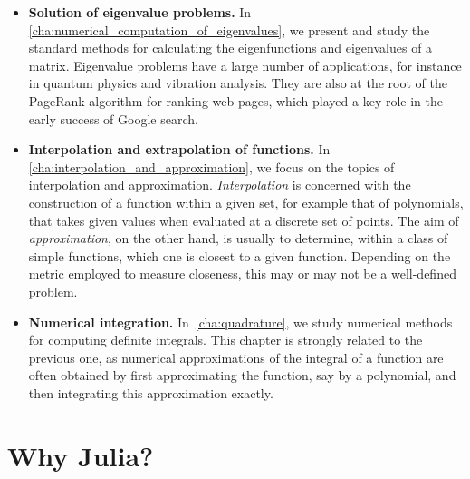 \begin{itemize}
    \item
        \textbf{Solution of eigenvalue problems.}
        In \cref{cha:numerical_computation_of_eigenvalues},
        we present and study the standard methods for calculating the eigenfunctions and eigenvalues of a matrix.
        Eigenvalue problems have a large number of applications,
        for instance in quantum physics and vibration analysis.
        They are also at the root of the PageRank algorithm for ranking web pages,
        which played a key role in the early success of Google search.

    \item
        \textbf{Interpolation and extrapolation of functions.}
        In \cref{cha:interpolation_and_approximation},
        we focus on the topics of interpolation and approximation.
        \emph{Interpolation} is concerned with the construction of a function within a given set,
        for example that of polynomials,
        that takes given values when evaluated at a discrete set of points.
        The aim of \emph{approximation}, on the other hand,
        is usually to determine, within a class of simple functions,
        which one is closest to a given function.
        Depending on the metric employed to measure closeness,
        this may or may not be a well-defined problem.

    \item
        \textbf{Numerical integration.}
        In~\cref{cha:quadrature},
        we study numerical methods for computing definite integrals.
        This chapter is strongly related to the previous one,
        as numerical approximations of the integral of a function are often obtained by first approximating the function,
        say by a polynomial, and then integrating this approximation exactly.
\end{itemize}


\section*{Why Julia?}%
\label{sec:why_julia_}


